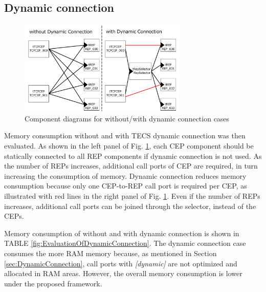 \documentclass[conference]{IEEEtran/IEEEtran}
\begin{document}
\subsection{Dynamic connection}

\begin{figure}[t]
    \centering
    \includegraphics[width=8.0cm,clip]{figure/ComparisonOfDynamicConnection.pdf}
    \vspace{-1mm} \caption{Component diagrams for without/with dynamic connection cases}
    \vspace{-1mm} \label{fig:ComparisonOfDynamicConnection}
\end{figure}

Memory consumption without and with TECS dynamic connection was then evaluated.
As shown in the left panel of Fig. \ref{fig:ComparisonOfDynamicConnection}, each CEP component should be statically connected to all REP components if dynamic connection is not used.
As the number of REPs increases, additional call ports of CEP are required, in turn increasing the consumption of memory. 
Dynamic connection reduces memory consumption because only one CEP-to-REP call port is required per CEP, as illustrated with red lines in the right panel of Fig. \ref{fig:ComparisonOfDynamicConnection}.
Even if the number of REPs increases, additional call ports can be joined through the selector, instead of the CEPs.

Memory consumption of without and with dynamic connection is shown in TABLE \ref{fig:EvaluationOfDynamicConnection}.
The dynamic connection case consumes the more RAM memory because, as mentioned in Section \ref{sec:DynamicConnection}, call ports with {\it [dynamic]} are not optimized and allocated in RAM areas.
However, the overall memory consumption is lower under the proposed framework.
\end{document}
